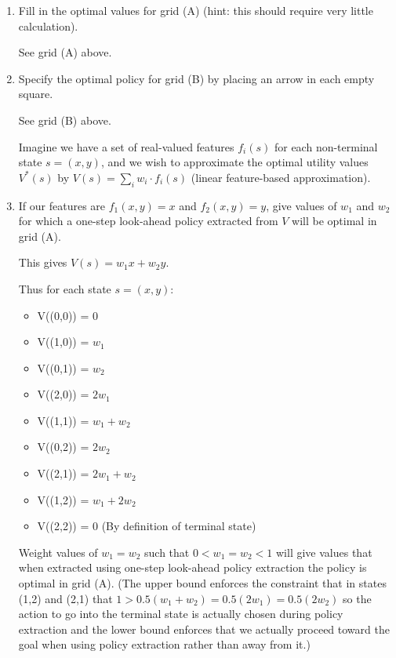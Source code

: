 \documentclass[12pt]{article}
\begin{document}
\begin{enumerate}

\item Fill in the optimal values for grid (A) (hint: this should require very little calculation).

  See grid (A) above.

\item  Specify the optimal policy for grid (B) by placing an arrow in each empty square.

  See grid (B) above.

\vspace{0.25in}

  Imagine we have a set of real-valued features $f_i(s)$ for each
  non-terminal state $s = (x, y)$, and we wish to approximate the
  optimal utility values $V^*(s)$ by $V(s) = \sum_i w_i \cdot f_i(s)$
  (linear feature-based approximation).

\item If our features are $f_1(x, y) = x$ and $f_2(x, y) = y$, give
  values of $w_1$ and $w_2$ for which a one-step look-ahead policy extracted
  from $V$ will be optimal in grid (A).

  This gives $V(s) = w_1 x + w_2 y$.

  Thus for each state $s = (x, y)$: 
  \begin{itemize}
    \item V((0,0)) = $0$
    \item V((1,0)) = $w_1$
    \item V((0,1)) = $w_2$
    \item V((2,0)) = $2 w_1$
    \item V((1,1)) = $w_1 + w_2$
    \item V((0,2)) = $2 w_2$
    \item V((2,1)) = $2 w_1 + w_2$
    \item V((1,2)) = $w_1 + 2 w_2$
    \item V((2,2)) = 0 (By definition of terminal state)
  \end{itemize}

  Weight values of $w_1 = w_2$ such that $0 < w_1 = w_2 < 1$ will give values that when extracted using one-step look-ahead policy extraction the policy is optimal in grid (A). 
  (The upper bound enforces the constraint that in states (1,2) and (2,1) that $1 > 0.5(w_1 + w_2) = 0.5(2 w_1) = 0.5(2 w_2)$ so the action to go into the terminal state is actually chosen during policy extraction and the lower bound enforces that we actually proceed toward the goal when using policy extraction rather than away from it.)


\end{enumerate}
\end{document}
